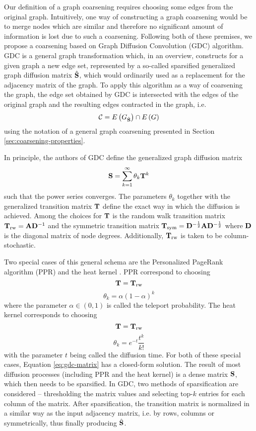Our definition of a graph coarsening requires choosing some edges from the original graph. Intuitively, one way of constructing a graph coarsening would be to merge nodes which are similar and therefore no significant amount of information is lost due to such a coarsening. Following both of these premises, we propose a coarsening based on Graph Diffusion Convolution (GDC) \cite{gasteiger_diffusion_2019} algorithm. GDC is a general graph transformation which, in an overview, constructs for a given graph a new edge set, represented by a so-called sparsified generalized graph diffusion matrix \( \hat{\mathbf{S}} \), which would ordinarily used as a replacement for the adjacency matrix of the graph. To apply this algorithm as a way of coarsening the graph, the edge set obtained by GDC is intersected with the edges of the original graph and the resulting edges contracted in the graph, i.e.
\[ \mathcal{C} = E \left( G_{\hat{\mathbf{S}}} \right) \cap E \left( G \right) \]
using the notation of a general graph coarsening presented in Section \ref{sec:coarsening-properties}.

In principle, the authors of GDC define the generalized graph diffusion matrix
\begin{equation}\label{eq:gdc-matrix}
  \mathbf{S} = \sum_{k = 1}^\infty \theta_k \mathbf{T}^k
\end{equation}
such that the power series converges. The parameters \( \theta_k \) together with the generalized transition matrix \( \mathbf{T} \) define the exact way in which the diffusion is achieved. Among the choices for \( \mathbf{T} \) is the random walk transition matrix \( \mathbf{T}_ \mathrm{rw} = \mathbf{A} \mathbf{D}^{-1} \) and the symmetric transition matrix \( \mathbf{T}_\mathrm{sym} = \mathbf{D}^{-\frac{1}{2}} \mathbf{A} \mathbf{D}^{-\frac{1}{2}} \) where \( \mathbf{D} \) is the diagonal matrix of node degrees. Additionally, \( \mathbf{T}_\mathrm{rw} \) is taken to be column-stochastic.

Two special cases of this general schema are the Personalized PageRank algorithm (PPR) \cite{page_pagerank_1999} and the heat kernel \cite{kondor_diffusion_2002}. PPR correspond to choosing
\[ \mathbf{T} = \mathbf{T}_\mathrm{rw} \]
\[ \theta_k = \alpha \left( 1 - \alpha \right)^k \]
where the parameter \( \alpha \in \left( 0, 1 \right) \) is called the teleport probability. The heat kernel corresponds to choosing
\[ \mathbf{T} = \mathbf{T}_\mathrm{rw} \]
\[ \theta_k = e^{-t} \frac{t^k}{k!} \]
with the parameter \( t \) being called the diffusion time. For both of these special cases, Equation \ref{eq:gdc-matrix} has a closed-form solution. The result of most diffusion processes (including PPR and the heat kernel) is a dense matrix \( \mathbf{S} \), which then needs to be sparsified. In GDC, two methods of sparsification are considered -- thresholding the matrix values and selecting top-\( k \) entries for each column of the matrix. After sparsification, the transition matrix is normalized in a similar way as the input adjacency matrix, i.e. by rows, columns or symmetrically, thus finally producing \( \hat{\mathbf{S}} \).

